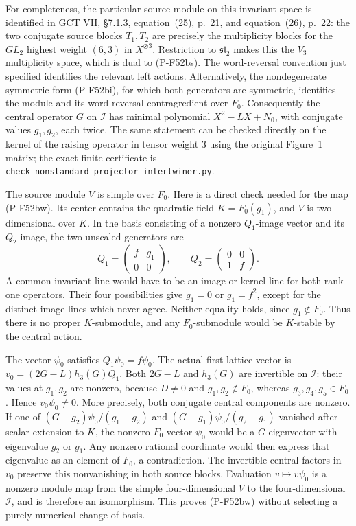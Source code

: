 For completeness, the particular source module on this invariant
space is identified in GCT VII, \S7.1.3, equation~(25), p.~21,
and equation~(26), p.~22: the two conjugate source blocks
$T_1,T_2$ are precisely the multiplicity blocks for the
$GL_2$ highest weight $(6,3)$ in $X^{\otimes3}$.
Restriction to $\mathfrak{sl}_2$ makes this the $V_3$ multiplicity
space, which is dual to (P-F52bs).  The word-reversal convention
just specified identifies the relevant left actions.  Alternatively,
the nondegenerate symmetric form (P-F52bi), for which both
generators are symmetric, identifies the module and its
word-reversal contragredient over $F_0$.
Consequently the central operator $G$ on $\mathcal I$ has
minimal polynomial $X^2-LX+N_0$, with conjugate values
$g_1,g_2$, each twice.  The same statement can be checked directly
on the kernel of the raising operator in tensor weight $3$ using
the original Figure~1 matrix; the exact finite certificate is
\texttt{check\_nonstandard\_projector\_intertwiner.py}.

The source module $V$ is simple over $F_0$.  Here is a direct
check needed for the map (P-F52bw).  Its center contains the
quadratic field $K=F_0(g_1)$, and $V$ is two-dimensional over $K$.
In the basis consisting of a nonzero $Q_1$-image vector and its
$Q_2$-image, the two unscaled generators are
\[
        Q_1=\begin{pmatrix}f&g_1\\0&0\end{pmatrix},\qquad
        Q_2=\begin{pmatrix}0&0\\1&f\end{pmatrix}.
\]
A common invariant line would have to be an image or kernel
line for both rank-one operators.  Their four possibilities
give $g_1=0$ or $g_1=f^2$, except for the distinct image lines
which never agree.  Neither equality holds, since $g_1\notin F_0$.
Thus there is no proper $K$-submodule, and any $F_0$-submodule
would be $K$-stable by the central action.

The vector $\psi_0$ satisfies $Q_1\psi_0=f\psi_0$.
The actual first lattice vector is
$v_0=(2G-L)h_3(G)Q_1$.
Both $2G-L$ and $h_3(G)$ are invertible on $\mathcal I$:
their values at $g_1,g_2$ are nonzero, because $D\ne0$ and
$g_1,g_2\notin F_0$, whereas $g_3,g_4,g_5\in F_0$.
Hence $v_0\psi_0\ne0$.
More precisely, both conjugate central components are nonzero.
If one of
$(G-g_2)\psi_0/(g_1-g_2)$ and
$(G-g_1)\psi_0/(g_2-g_1)$ vanished after scalar extension to $K$,
the nonzero $F_0$-vector $\psi_0$ would be a $G$-eigenvector
with eigenvalue $g_2$ or $g_1$.  Any nonzero rational coordinate
would then express that eigenvalue as an element of $F_0$,
a contradiction.  The invertible central factors in $v_0$
preserve this nonvanishing in both source blocks.
Evaluation $v\mapsto v\psi_0$ is a nonzero module map from
the simple four-dimensional $V$ to the four-dimensional
$\mathcal I$, and is therefore an isomorphism.  This proves
(P-F52bw) without selecting a purely numerical change of basis.

